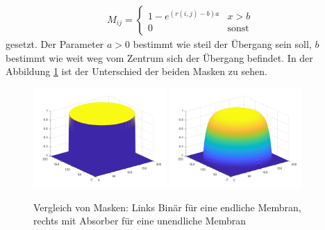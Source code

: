 \begin{align}
	M_{ij} = \begin{cases} 1-e^{(r(i,j)-b)a} & \text{$x > b$} \\
		0 & \text{sonst} \end{cases}
\end{align}
gesetzt.
Der Parameter $a > 0$ bestimmt wie steil der Übergang sein soll, $b$ bestimmt  wie weit weg vom Zentrum sich der Übergang befindet.
In der Abbildung \ref{kreismembran:im:masks} ist der Unterschied der beiden Masken zu sehen. 
\begin{figure}
	
	\begin{center}
		
		\includegraphics[width=0.45\textwidth]{papers/kreismembran/images/mask_disk.png}
		\includegraphics[width=0.45\textwidth]{papers/kreismembran/images/mask_absorber.png}
		\caption{Vergleich von Masken: Links Binär für eine endliche Membran, rechts mit Absorber für eine unendliche Membran}
		\label{kreismembran:im:masks}
	\end{center}	
\end{figure} 
